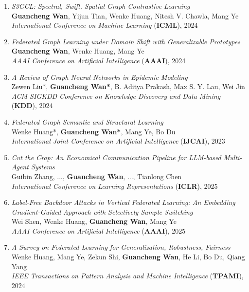 \begin{enumerate}
    \item \textit{S3GCL: Spectral, Swift, Spatial Graph Contrastive Learning} \\
    \textbf{Guancheng Wan}, Yijun Tian, Wenke Huang, Nitesh V. Chawla, Mang Ye \\
    \hfill \textit{International Conference on Machine Learning} (\textbf{ICML}), 2024

    \item \textit{Federated Graph Learning under Domain Shift with Generalizable Prototypes} \\
    \textbf{Guancheng Wan}, Wenke Huang, Mang Ye \\
    \hfill \textit{AAAI Conference on Artificial Intelligence} (\textbf{AAAI}), 2024

    \item \textit{A Review of Graph Neural Networks in Epidemic Modeling} \\
    Zewen Liu*,\textbf{ Guancheng Wan*}, B. Aditya Prakash, Max S. Y. Lau, Wei Jin \\
    \hfill \textit{ACM SIGKDD Conference on Knowledge Discovery and Data Mining} (\textbf{KDD}), 2024

    \item \textit{Federated Graph Semantic and Structural Learning} \\
    Wenke Huang*,\textbf{ Guancheng Wan*}, Mang Ye, Bo Du \\
    \hfill \textit{International Joint Conference on Artificial Intelligence} (\textbf{IJCAI}), 2023

    \item \textit{Cut the Crap: An Economical Communication Pipeline for LLM-based Multi-Agent Systems} \\
    Guibin Zhang, ..., \textbf{Guancheng Wan}, ..., Tianlong Chen \\
    \hfill \textit{International Conference on Learning Representations} (\textbf{ICLR}), 2025

    \item \textit{Label-Free Backdoor Attacks in Vertical Federated Learning: An Embedding Gradient-Guided Approach with Selectively Sample Switching} \\
    Wei Shen, Wenke Huang, \textbf{Guancheng Wan}, Mang Ye \\
    \hfill \textit{AAAI Conference on Artificial Intelligence} (\textbf{AAAI}), 2025

    \item \textit{A Survey on Federated Learning for Generalization, Robustness, Fairness} \\
    Wenke Huang, Mang Ye, Zekun Shi, \textbf{Guancheng Wan}, He Li, Bo Du, Qiang Yang \\
    \hfill \textit{IEEE Transactions on Pattern Analysis and Machine Intelligence} (\textbf{TPAMI}), 2024


\end{enumerate}
